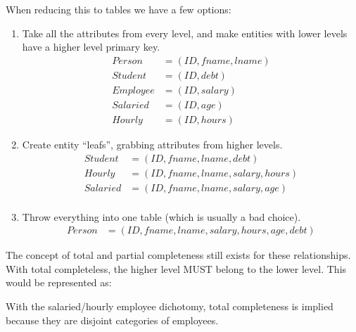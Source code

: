 \documentclass{math}
\begin{document}
When reducing this to tables we have a few options:
\begin{enumerate}
  \item Take all the attributes from every level, and make entities with lower
    levels have a higher level primary key.
  \begin{align*}
    Person &= (ID, fname, lname) \\
    Student &= (ID, debt) \\
    Employee &= (ID, salary) \\
    Salaried &= (ID, age) \\
    Hourly &= (ID, hours)
  \end{align*}
  \item Create entity ``leafs'', grabbing attributes from higher levels.
  \begin{align*}
    Student &= (ID, fname, lname, debt) \\
    Hourly &= (ID, fname, lname, salary, hours) \\
    Salaried &= (ID, fname, lname, salary, age) \\
  \end{align*}
  \item Throw everything into one table (which is usually a bad choice).
  \begin{align*}
    Person &= (ID, fname, lname, salary, hours, age, debt)
  \end{align*}
\end{enumerate}
The concept of total and partial completeness still exists for these
relationships. With total completeless, the higher level MUST belong to the
lower level. This would be represented as:
\begin{center}
\end{center}
With the salaried/hourly employee dichotomy, total completeness is implied
because they are disjoint categories of employees.
\end{document}
